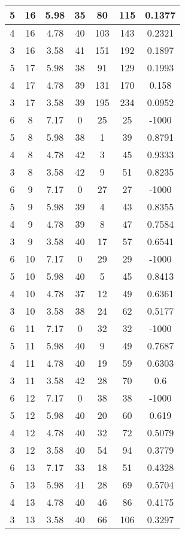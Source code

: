 \documentclass[letterpaper, 12pt]{article}
\begin{document}
\begin{longtable}{|c|c|c|c|c|c|c|}
\hline
5 & 16 & 5.98 & 35 & 80 & 115 & 0.1377 \\
\hline
4 & 16 & 4.78 & 40 & 103 & 143 & 0.2321 \\
\hline
3 & 16 & 3.58 & 41 & 151 & 192 & 0.1897 \\
\hline
5 & 17 & 5.98 & 38 & 91 & 129 & 0.1993 \\
\hline
4 & 17 & 4.78 & 39 & 131 & 170 & 0.158 \\
\hline
3 & 17 & 3.58 & 39 & 195 & 234 & 0.0952 \\
\hline
6 & 8 & 7.17 & 0 & 25 & 25 & -1000 \\
\hline
5 & 8 & 5.98 & 38 & 1 & 39 & 0.8791 \\
\hline
4 & 8 & 4.78 & 42 & 3 & 45 & 0.9333 \\
\hline
3 & 8 & 3.58 & 42 & 9 & 51 & 0.8235 \\
\hline
6 & 9 & 7.17 & 0 & 27 & 27 & -1000 \\
\hline
5 & 9 & 5.98 & 39 & 4 & 43 & 0.8355 \\
\hline
4 & 9 & 4.78 & 39 & 8 & 47 & 0.7584 \\
\hline
3 & 9 & 3.58 & 40 & 17 & 57 & 0.6541 \\
\hline
6 & 10 & 7.17 & 0 & 29 & 29 & -1000 \\
\hline
5 & 10 & 5.98 & 40 & 5 & 45 & 0.8413 \\
\hline
4 & 10 & 4.78 & 37 & 12 & 49 & 0.6361 \\
\hline
3 & 10 & 3.58 & 38 & 24 & 62 & 0.5177 \\
\hline
6 & 11 & 7.17 & 0 & 32 & 32 & -1000 \\
\hline
5 & 11 & 5.98 & 40 & 9 & 49 & 0.7687 \\
\hline
4 & 11 & 4.78 & 40 & 19 & 59 & 0.6303 \\
\hline
3 & 11 & 3.58 & 42 & 28 & 70 & 0.6 \\
\hline
6 & 12 & 7.17 & 0 & 38 & 38 & -1000 \\
\hline
5 & 12 & 5.98 & 40 & 20 & 60 & 0.619 \\
\hline
4 & 12 & 4.78 & 40 & 32 & 72 & 0.5079 \\
\hline
3 & 12 & 3.58 & 40 & 54 & 94 & 0.3779 \\
\hline
6 & 13 & 7.17 & 33 & 18 & 51 & 0.4328 \\
\hline
5 & 13 & 5.98 & 41 & 28 & 69 & 0.5704 \\
\hline
4 & 13 & 4.78 & 40 & 46 & 86 & 0.4175 \\
\hline
3 & 13 & 3.58 & 40 & 66 & 106 & 0.3297 \\

\end{longtable}
\end{document}
